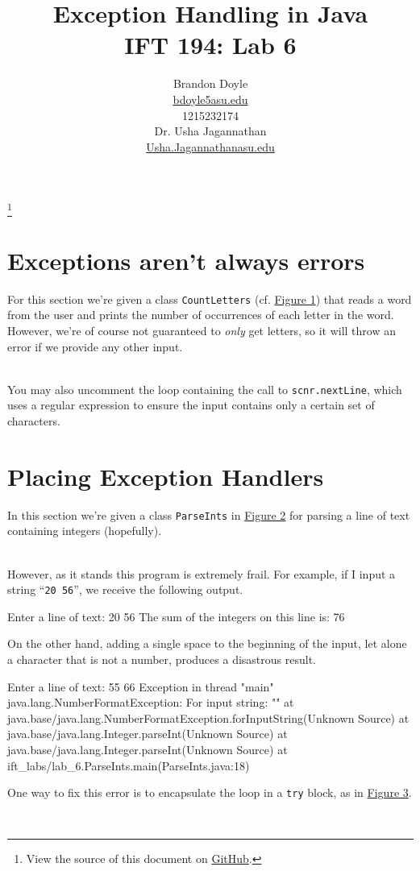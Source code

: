 \documentclass[leqno, 11pt]{article}
\title{\vspace{6ex}Exception Handling in Java\\
  \Large IFT 194: Lab 6}
\author{Brandon Doyle\\
\href{mailto:bdoyle@asu.edu}{bdoyle5\at{}asu.edu}\\
1215232174\\[1em]
Dr. Usha Jagannathan\\
\href{mailto:Usha.Jagannathan@asu.edu}{Usha.Jagannathan\at{}asu.edu}}
\newcommand\blfootnote[1]{%
  \begingroup
    \renewcommand\thefootnote{}\footnote{#1}
    \addtocounter{footnote}{-1}
  \endgroup
}
\newcommand{\iftcodefigure}[3]{%
  \begin{codefigure}
    \label{#1}
    \addtocounter{figure}{-1}
    
  \end{codefigure}
}
\begin{document}
\begin{titlepage}
\clearpage\maketitle
\thispagestyle{empty}
\end{titlepage}
\tableofcontents
\blfootnote{View the source of this document on \href{https://github.com/bjd2385/IFT_194_labs/blob/master/\jobname.tex}{GitHub}.}
\newpage
\section{Exceptions aren't always errors}
For this section we're given a class \texttt{CountLetters} (cf. \hyperref[fig:one]{Figure 1}) that reads a word from the user and prints the number of occurrences of each letter in the word. However, we're of course not guaranteed to \textit{only} get letters, so it will throw an error if we provide any other input. 
\iftcodefigure{fig:one}{CountLetters.java}{%
  /mnt/c/Users/bdoyle/eclipse-workspace/ift_labs/src/lab_6/CountLetters.java}\\
You may also uncomment the loop containing the call to \texttt{scnr.nextLine}, which uses a regular expression to ensure the input contains only a certain set of characters.
\section{Placing Exception Handlers}
In this section we're given a class \texttt{ParseInts} in \hyperref[fig:two]{Figure 2} for parsing a line of text containing integers (hopefully).
\iftcodefigure{fig:two}{ParseInts.java}{%
  /mnt/c/Users/bdoyle/eclipse-workspace/ift_labs/src/lab_6/ParseInts.java}\\
However, as it stands this program is extremely frail. For example, if I input a string ``\texttt{20 56}'', we receive the following output.
\begin{verbbox}[\mbox{}\scriptsize]
Enter a line of text: 20 56
The sum of the integers on this line is: 76
\end{verbbox}
\begin{center}
  \theverbbox
\end{center}
On the other hand, adding a single space to the beginning of the input, let alone a character that is not a number, produces a disastrous result.
\begin{verbbox}[\mbox{}\scriptsize]
Enter a line of text:  55 66
Exception in thread "main" java.lang.NumberFormatException: For input string: ""
  at java.base/java.lang.NumberFormatException.forInputString(Unknown Source)
  at java.base/java.lang.Integer.parseInt(Unknown Source)
  at java.base/java.lang.Integer.parseInt(Unknown Source)
  at ift_labs/lab_6.ParseInts.main(ParseInts.java:18)
\end{verbbox}
\begin{center}
  \theverbbox
\end{center}
One way to fix this error is to encapsulate the loop in a \texttt{try} block, as in \hyperref[fig:three]{Figure 3}.
\iftcodefigure{fig:three}{ParseIntsBetter.java}{%
  /mnt/c/Users/bdoyle/eclipse-workspace/ift_labs/src/lab_6/ParseIntsBetter.java}\\
\end{document}
